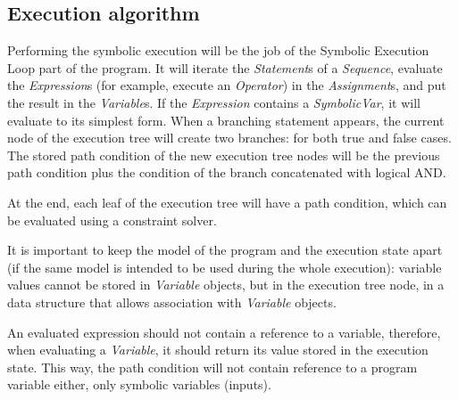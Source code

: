 \subsection{Execution algorithm}

Performing the symbolic execution will be the job of the Symbolic Execution Loop part of the program. It will iterate the \textit{Statement}s of a \textit{Sequence}, evaluate the \textit{Expression}s (for example, execute an \textit{Operator}) in the \textit{Assignment}s, and put the result in the \textit{Variable}s. If the \textit{Expression} contains a \textit{SymbolicVar}, it will evaluate to its simplest form. When a branching statement appears, the current node of the execution tree will create two branches: for both true and false cases. The stored path condition of the new execution tree nodes will be the previous path condition plus the condition of the branch concatenated with logical AND.

At the end, each leaf of the execution tree will have a path condition, which can be evaluated using a constraint solver.

It is important to keep the model of the program and the execution state apart (if the same model is intended to be used during the whole execution): variable values cannot be stored in \textit{Variable} objects, but in the execution tree node, in a data structure that allows association with \textit{Variable} objects. 

An evaluated expression should not contain a reference to a variable, therefore, when evaluating a \textit{Variable}, it should return its value stored in the execution state. This way, the path condition will not contain reference to a program variable either, only symbolic variables (inputs).

